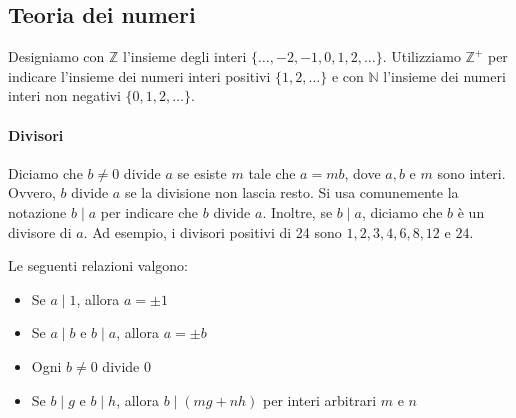 \documentclass{article}
\theoremstyle{definition}
\begin{document}


\subsection{Teoria dei numeri}
Designiamo con \( \mathbb{Z} \) l'insieme degli interi \( \{ \ldots, -2, -1, 0, 1, 2, \ldots \} \). Utilizziamo \( \mathbb{Z}^+ \) per indicare l'insieme dei numeri interi positivi \( \{ 1, 2, \ldots \} \) e con \( \mathbb{N} \) l'insieme dei numeri interi non negativi \( \{ 0, 1, 2, \ldots \} \).

\paragraph{Divisori}Diciamo che \( b \neq 0 \) divide \( a \) se esiste \( m \) tale che \( a = mb \), dove \( a, b \) e \( m \) sono interi. Ovvero, \( b \) divide \( a \) se la divisione non lascia resto. Si usa comunemente la notazione \( b \mid a \) per indicare che \( b \) divide \( a \). Inoltre, se \( b \mid a \), diciamo che \( b \) è un divisore di \( a \). Ad esempio, i divisori positivi di 24 sono \( 1, 2, 3, 4, 6, 8, 12 \) e \( 24 \).

Le seguenti relazioni valgono:
\begin{itemize}
\item Se \( a \mid 1 \), allora \( a = \pm 1 \)
\item Se \( a \mid b \) e \( b \mid a \), allora \( a = \pm b \)
\item Ogni \( b \neq 0 \) divide \( 0 \)
\item Se \( b \mid g \) e \( b \mid h \), allora \( b \mid (mg + nh) \) per interi arbitrari \( m \) e \( n \)
\end{itemize}
\end{document}
